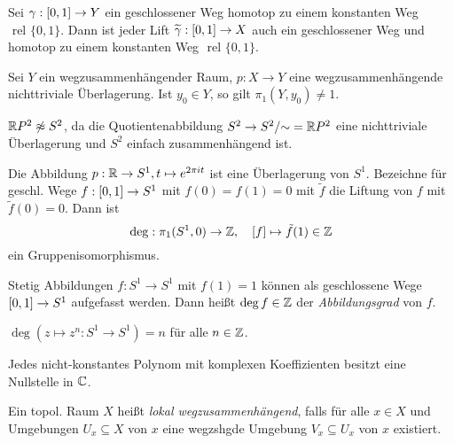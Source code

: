 \documentclass{cheat-sheet}
\newcommand{\rel}{\text{ rel }} %
\begin{document}
\begin{kor}
  Sei $\gamma : \left[ 0, 1 \right] \to Y$ ein geschlossener Weg homotop zu einem konstanten Weg $\rel \{ 0, 1 \}$. Dann ist jeder Lift $\widetilde{\gamma} : \left[ 0, 1 \right] \to X$ auch ein geschlossener Weg und homotop zu einem konstanten Weg $\rel \{ 0, 1 \}$.
\end{kor}

\begin{kor}
  Sei $Y$ ein wegzusammenhängender Raum, $p : X \to Y$ eine wegzusammenhängende nichttriviale Überlagerung. Ist $y_0 \in Y$, so gilt $\pi_1(Y, y_0) \not= 1$.
\end{kor}

\begin{kor}
  $\mathbb{R} P^2 \not\approx S^2$, da die Quotientenabbildung $S^2 \to S^2/{\sim} = \mathbb{R} P^2$ eine nichttriviale Überlagerung und $S^2$ einfach zusammenhängend ist.
\end{kor}

\begin{prop}
  Die Abbildung $p : \mathbb{R} \to S^1, t \mapsto e^{2 \pi i t}$ ist eine Überlagerung von $S^1$. Bezeichne für geschl. Wege $f : \left[ 0, 1 \right] \to S^1$ mit $f(0) = f(1) = 0$ mit $\tilde{f}$ die Liftung von $f$ mit $\tilde{f}(0) = 0$. Dann ist
  \[ \mathrm{deg} : \pi_1(S^1, 0) \to \mathbb{Z}, \quad [f] \mapsto \tilde{f}(1) \in \mathbb{Z} \]
  ein Gruppenisomorphismus.
\end{prop}

\begin{defn}
  Stetig Abbildungen $f : S^1 \to S^1$ mit $f(1) = 1$ können als geschlossene Wege $\left[ 0, 1 \right] \to S^1$ aufgefasst werden. Dann heißt $\deg f \in \mathbb{Z}$ der \emph{Abbildungsgrad} von $f$.
\end{defn}

\begin{prop}
  $\deg(z \mapsto z^n : S^1 \to S^1) = n$ für alle $n \in \mathbb{Z}$.
\end{prop}



\begin{kor}
  Jedes nicht-konstantes Polynom mit komplexen Koeffizienten besitzt eine Nullstelle in $\mathbb{C}$.
\end{kor}


\begin{defn}
  Ein topol. Raum $X$ heißt \emph{lokal wegzusammenhängend}, falls für alle $x \in X$ und Umgebungen $U_x \subseteq X$ von $x$ eine wegzshgde Umgebung $V_x \subseteq U_x$ von $x$ existiert.
\end{defn}
\end{document}
